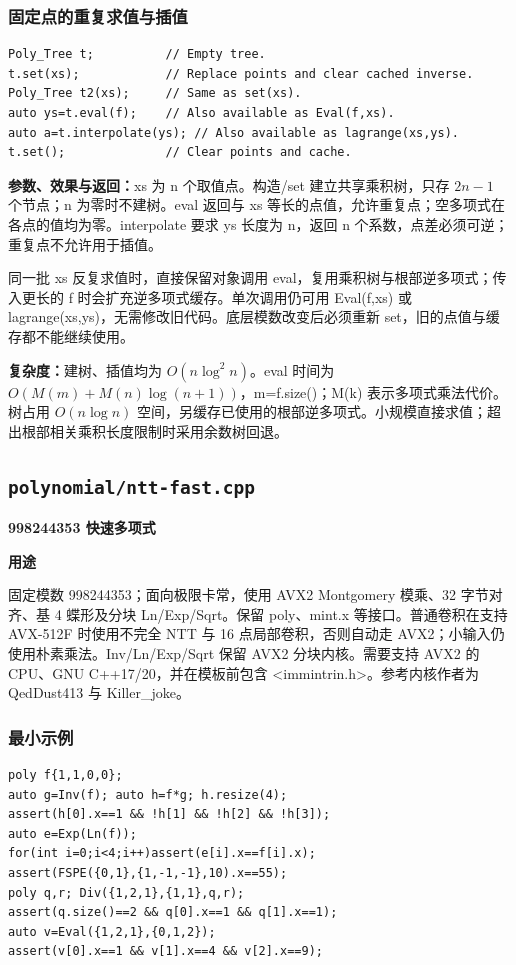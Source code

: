 \documentclass[UTF8,a4paper,10pt]{ctexart}
\newcommand{\TemplUsage}[1]{\textbf{用途}\par #1\par}
\begin{document}
\noindent\begin{minipage}{\textwidth}
\subsubsection*{固定点的重复求值与插值}
\begin{lstlisting}
Poly_Tree t;          // Empty tree.
t.set(xs);            // Replace points and clear cached inverse.
Poly_Tree t2(xs);     // Same as set(xs).
auto ys=t.eval(f);    // Also available as Eval(f,xs).
auto a=t.interpolate(ys); // Also available as lagrange(xs,ys).
t.set();              // Clear points and cache.
\end{lstlisting}
\textbf{参数、效果与返回：}xs 为 n 个取值点。构造/set 建立共享乘积树，只存 $2n-1$ 个节点；n 为零时不建树。eval 返回与 xs 等长的点值，允许重复点；空多项式在各点的值均为零。interpolate 要求 ys 长度为 n，返回 n 个系数，点差必须可逆；重复点不允许用于插值。

同一批 xs 反复求值时，直接保留对象调用 eval，复用乘积树与根部逆多项式；传入更长的 f 时会扩充逆多项式缓存。单次调用仍可用 Eval(f,xs) 或 lagrange(xs,ys)，无需修改旧代码。底层模数改变后必须重新 set，旧的点值与缓存都不能继续使用。

\textbf{复杂度：}建树、插值均为 $O(n\log^2 n)$。eval 时间为 $O(M(m)+M(n)\log(n+1))$，m=f.size()；M(k) 表示多项式乘法代价。树占用 $O(n\log n)$ 空间，另缓存已使用的根部逆多项式。小规模直接求值；超出根部相关乘积长度限制时采用余数树回退。
\end{minipage}\par
\clearpage
\subsection{\texttt{polynomial/ntt-fast.cpp}}
\textbf{998244353 快速多项式}\par
\TemplUsage{固定模数 998244353；面向极限卡常，使用 AVX2 Montgomery 模乘、32 字节对齐、基 4 蝶形及分块 Ln/Exp/Sqrt。保留 poly、mint.x 等接口。普通卷积在支持 AVX-512F 时使用不完全 NTT 与 16 点局部卷积，否则自动走 AVX2；小输入仍使用朴素乘法。Inv/Ln/Exp/Sqrt 保留 AVX2 分块内核。需要支持 AVX2 的 CPU、GNU C++17/20，并在模板前包含 <immintrin.h>。参考内核作者为 QedDust413 与 Killer\_joke。}
\subsubsection*{最小示例}
\begin{lstlisting}
poly f{1,1,0,0};
auto g=Inv(f); auto h=f*g; h.resize(4);
assert(h[0].x==1 && !h[1] && !h[2] && !h[3]);
auto e=Exp(Ln(f));
for(int i=0;i<4;i++)assert(e[i].x==f[i].x);
assert(FSPE({0,1},{1,-1,-1},10).x==55);
poly q,r; Div({1,2,1},{1,1},q,r);
assert(q.size()==2 && q[0].x==1 && q[1].x==1);
auto v=Eval({1,2,1},{0,1,2});
assert(v[0].x==1 && v[1].x==4 && v[2].x==9);
\end{lstlisting}
\end{document}
